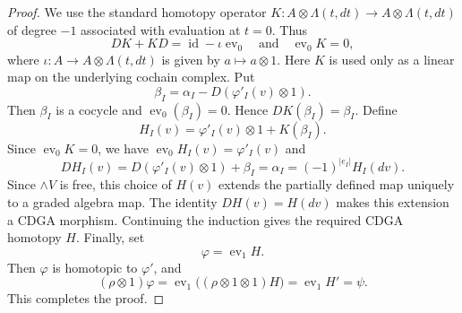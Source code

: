 \documentclass[10pt,a4paper]{amsart}
\newcommand{\ev}{\operatorname{ev}}
\begin{document}
\begin{proof}
We use the standard
homotopy operator
$
K:A\otimes\Lambda(t,dt)\to A\otimes\Lambda(t,dt)
$
of degree $-1$ associated with evaluation at $t=0$. Thus
\[
        DK+KD=\operatorname{id}-\iota\operatorname{ev}_0
        \quad
        \text{and}
        \quad
        \operatorname{ev}_0K=0,
\]
where $\iota:A\to A\otimes\Lambda(t,dt)$ is given by $a\mapsto a\otimes 1$.
Here $K$ is used only as a linear map on the underlying cochain complex.
Put
\[
        \beta_I=\alpha_I-D(\varphi'_I(v)\otimes 1).
\]
Then $\beta_I$ is a cocycle and $\ev_0(\beta_I)=0$. Hence
$DK(\beta_I)=\beta_I$. Define
\[
H_I(v)
=
\varphi'_I(v)\otimes 1
+
K(\beta_I).
\]
Since $\ev_0K=0$, we have
$
\operatorname{ev}_0H_I(v)=\varphi'_I(v)
$
and
\[
        DH_I(v)
        =
        D(\varphi'_I(v)\otimes 1)+\beta_I
        =
        \alpha_I
        =
        (-1)^{|e_I|}H_I(dv).
\]
Since $\wedge V$ is free, this choice of $H(v)$ extends the partially defined
map uniquely to a graded algebra map.
The identity
$DH(v)=H(dv)$ makes this extension a CDGA morphism.
Continuing the
induction gives the required CDGA homotopy $H$.
Finally, set
\[
        \varphi=\ev_1 H.
\]
Then $\varphi$ is homotopic to $\varphi'$, and
\[
(\rho\otimes 1)\varphi
=
\ev_1 \bigl((\rho\otimes 1\otimes 1)H\bigr)
=
\ev_1 H'
=
\psi.
\]
This completes the proof.
\end{proof}
\end{document}
